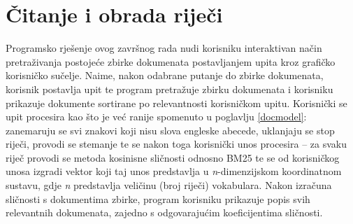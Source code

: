 \documentclass[times, utf8, zavrsni]{fer}
\begin{document}
\section{Čitanje i obrada riječi}
Programsko rješenje ovog završnog rada nudi korisniku interaktivan način pretraživanja postojeće zbirke dokumenata postavljanjem upita kroz grafičko korisničko sučelje. Naime, nakon odabrane putanje do zbirke dokumenata, korisnik postavlja upit te program pretražuje zbirku dokumenata i korisniku prikazuje dokumente sortirane po relevantnosti korisničkom upitu.
Korisnički se upit procesira kao što je već ranije spomenuto u poglavlju \ref{docmodel}: zanemaruju se svi znakovi koji nisu slova engleske abecede, uklanjaju se stop riječi, provodi se stemanje te se nakon toga korisnički unos procesira -- za svaku riječ provodi se metoda kosinisne sličnosti odnosno BM25 te se od korisničkog unosa izgradi vektor koji taj unos predstavlja u \textit{n}-dimenzijskom koordinatnom sustavu, gdje \textit{n} predstavlja veličinu (broj riječi) vokabulara. Nakon izračuna sličnosti s dokumentima zbirke, program korisniku prikazuje popis svih relevantnih dokumenata, zajedno s odgovarajućim koeficijentima sličnosti.
\end{document}
